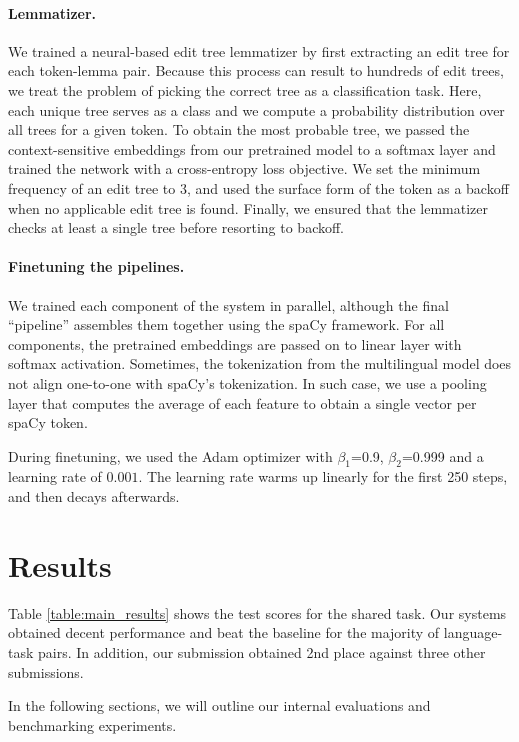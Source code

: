 \documentclass[11pt]{article}
\begin{document}
\paragraph{Lemmatizer.}
We trained a neural-based edit tree lemmatizer \cite{muller-etal-2015-joint} by first extracting an edit tree for each token-lemma pair.
Because this process can result to hundreds of edit trees, we treat the problem of picking the correct tree as a classification task.
Here, each unique tree serves as a class and we compute a probability distribution over all trees for a given token.
To obtain the most probable tree, we passed the context-sensitive embeddings from our pretrained model to a softmax layer and trained the network with a cross-entropy loss objective.
We set the minimum frequency of an edit tree to 3, and used the surface form of the token as a backoff when no applicable edit tree is found.
Finally, we ensured that the lemmatizer checks at least a single tree before resorting to backoff.

\paragraph{Finetuning the pipelines.} We trained each component of the system in parallel, although the final ``pipeline'' assembles them together using the spaCy framework.
For all components, the pretrained embeddings are passed on to linear layer with softmax activation.
Sometimes, the tokenization from the multilingual model does not align one-to-one with spaCy's tokenization.
In such case, we use a pooling layer that computes the average of each feature to obtain a single vector per spaCy token.

During finetuning, we used the Adam optimizer with $\beta_1$=0.9, $\beta_2$=0.999 and a learning rate of $0.001$.
The learning rate warms up linearly for the first 250 steps, and then decays afterwards.

\section{Results}

Table \ref{table:main_results} shows the test scores for the shared task.
Our systems obtained decent performance and beat the baseline for the majority of language-task pairs.
In addition, our submission obtained 2nd place against three other submissions.

In the following sections, we will outline our internal evaluations and benchmarking experiments.
\end{document}
